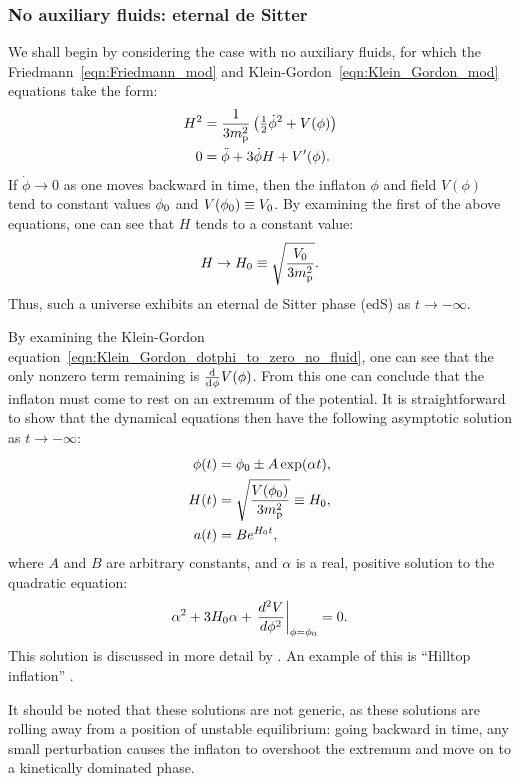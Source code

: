 \subsubsection{No auxiliary fluids: eternal de Sitter}
We shall begin by considering the case with no auxiliary fluids, for which the Friedmann~\eqref{eqn:Friedmann_mod} and Klein-Gordon~\eqref{eqn:Klein_Gordon_mod} equations take the form:
%
\begin{align}
  H^2 
  &=
  \frac{1}{3m_{\mathrm{p}}^2}\left({\textstyle\frac{1}{2}}\dot{\phi}^2 + V(\phi) \right)
  \label{eqn:Friedmann_dotphi_to_zero_no_fluid} 
  \\
  0
  &=
  \ddot{\phi} +3\dot{\phi}H + V^\prime(\phi).
  \label{eqn:Klein_Gordon_dotphi_to_zero_no_fluid}
\end{align}
%
If \(\dot{\phi}\to 0\) as one moves backward in time, then the inflaton \(\phi\) and field \(V(\phi)\) tend to constant values \(\phi_0\) and \(V(\phi_0)\equiv V_0\). By examining the first of the above equations, one can see that \(H\) tends to a constant value:
%
\begin{equation}
  H\to H_0 \equiv \sqrt{\frac{V_0}{3m_{\mathrm{p}}^2}}.
\end{equation}
%
Thus, such a universe exhibits an eternal de Sitter phase (edS) as \(t\to-\infty\).

By examining the Klein-Gordon equation~\eqref{eqn:Klein_Gordon_dotphi_to_zero_no_fluid}, one can see that the only nonzero term remaining is \(\frac{\operatorname{d}^{}\!{}}{\operatorname{d}^{}\!{\phi}}V(\phi)\). From this one can conclude that the inflaton must come to rest on an extremum of the potential. It is straightforward to show that the dynamical equations then have the following asymptotic solution as \(t \to -\infty\):
%
\begin{align}
  \phi(t)
  &=
  \phi_0 \pm A \exp(\alpha t),\\
  H(t)
  &=
  \sqrt{\frac{V(\phi_0)}{3m_{\mathrm{p}}^2}} \equiv H_0,\\
  a(t)
  &=
  B e^{H_0t},
\end{align}
%
where \(A\) and \(B\)  are arbitrary constants, and \(\alpha\) is a real, positive solution to the quadratic equation:
% 
%
\begin{equation}
  \alpha^2 + 3H_0\alpha + \left.
  \frac{{d^2}V}{{d}\phi^2}\right|_{\phi=\phi_0}=0.
\end{equation}
%
This solution is discussed in more detail by \citet{destri_preinflationary_2010}. An example of this is ``Hilltop inflation'' \citep{linde_1982,albrecht_1982}. 

It should be noted that these solutions are not generic, as these solutions are rolling away from a position of unstable equilibrium: going backward in time, any small perturbation causes the inflaton to overshoot the extremum and move on to a kinetically dominated phase.


